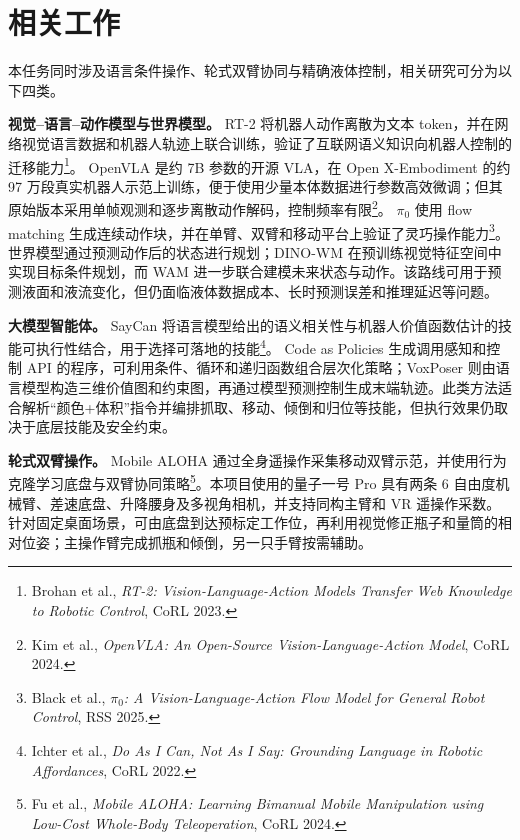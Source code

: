 \section{相关工作}

本任务同时涉及语言条件操作、轮式双臂协同与精确液体控制，相关研究可分为以下四类。

\textbf{视觉--语言--动作模型与世界模型。}
RT-2 将机器人动作离散为文本 token，并在网络视觉语言数据和机器人轨迹上联合训练，验证了互联网语义知识向机器人控制的迁移能力\footnote{Brohan et al., \emph{RT-2: Vision-Language-Action Models Transfer Web Knowledge to Robotic Control}, CoRL 2023.}。
OpenVLA 是约 7B 参数的开源 VLA，在 Open X-Embodiment 的约 97 万段真实机器人示范上训练，便于使用少量本体数据进行参数高效微调；但其原始版本采用单帧观测和逐步离散动作解码，控制频率有限\footnote{Kim et al., \emph{OpenVLA: An Open-Source Vision-Language-Action Model}, CoRL 2024.}。
$\pi_0$ 使用 flow matching 生成连续动作块，并在单臂、双臂和移动平台上验证了灵巧操作能力\footnote{Black et al., \emph{$\pi_0$: A Vision-Language-Action Flow Model for General Robot Control}, RSS 2025.}。
世界模型通过预测动作后的状态进行规划；DINO-WM 在预训练视觉特征空间中实现目标条件规划，而 WAM 进一步联合建模未来状态与动作。该路线可用于预测液面和液流变化，但仍面临液体数据成本、长时预测误差和推理延迟等问题。

\textbf{大模型智能体。}
SayCan 将语言模型给出的语义相关性与机器人价值函数估计的技能可执行性结合，用于选择可落地的技能\footnote{Ichter et al., \emph{Do As I Can, Not As I Say: Grounding Language in Robotic Affordances}, CoRL 2022.}。
Code as Policies 生成调用感知和控制 API 的程序，可利用条件、循环和递归函数组合层次化策略；VoxPoser 则由语言模型构造三维价值图和约束图，再通过模型预测控制生成末端轨迹。此类方法适合解析“颜色+体积”指令并编排抓取、移动、倾倒和归位等技能，但执行效果仍取决于底层技能及安全约束。

\textbf{轮式双臂操作。}
Mobile ALOHA 通过全身遥操作采集移动双臂示范，并使用行为克隆学习底盘与双臂协同策略\footnote{Fu et al., \emph{Mobile ALOHA: Learning Bimanual Mobile Manipulation using Low-Cost Whole-Body Teleoperation}, CoRL 2024.}。本项目使用的量子一号 Pro 具有两条 6 自由度机械臂、差速底盘、升降腰身及多视角相机，并支持同构主臂和 VR 遥操作采数。针对固定桌面场景，可由底盘到达预标定工作位，再利用视觉修正瓶子和量筒的相对位姿；主操作臂完成抓瓶和倾倒，另一只手臂按需辅助。

